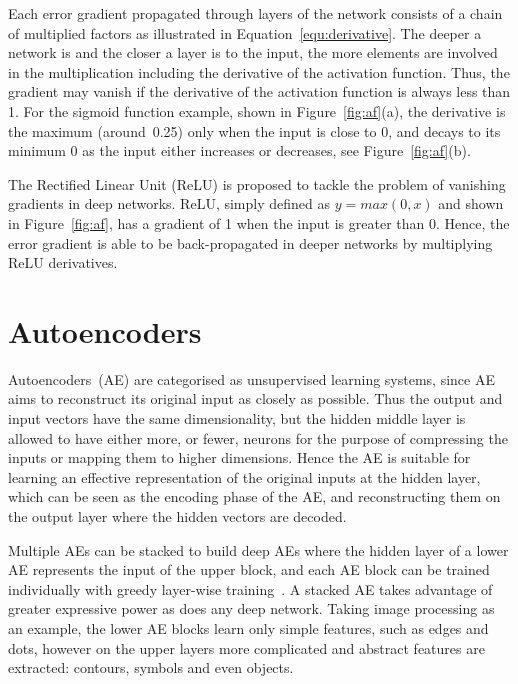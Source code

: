 Each error gradient propagated through layers of the network consists of a chain of multiplied factors as illustrated in Equation~\ref{equ:derivative}.
The deeper a network is and the closer a layer is to the input, the more elements are involved in the multiplication including the derivative of the activation function.
Thus, the gradient may vanish if the derivative of the activation function is always less than 1.
For the sigmoid function example, shown in Figure~\ref{fig:af}(a), the derivative is the maximum (around~0.25) only when the input is close to 0, and decays to its minimum 0 as the input either increases or decreases, see Figure~\ref{fig:af}(b).

The Rectified Linear Unit (ReLU) is proposed to tackle the problem of vanishing gradients in deep networks.
ReLU, simply defined as $y = max(0,x)$ and shown in Figure~\ref{fig:af}, has a gradient of 1 when the input is greater than 0.
Hence, the error gradient is able to be back-propagated in deeper networks by multiplying ReLU derivatives.

\section{Autoencoders}
\label{sec:AE}
Autoencoders~(AE) are categorised as unsupervised learning systems, since AE aims to reconstruct its original input as closely as possible.
Thus the output and input vectors have the same dimensionality, but the hidden middle layer is allowed to have either more, or fewer, neurons for the purpose of compressing the inputs or mapping them to higher dimensions.
Hence the AE is suitable for learning an effective representation of the original inputs at the hidden layer, which can be seen as the encoding phase of the AE, and reconstructing them on the output layer where the hidden vectors are decoded. 

Multiple AEs can be stacked to build deep AEs where the hidden layer of a lower AE represents the input of the upper block, and each AE block can be trained individually with greedy layer-wise training~\citep{hinton2006fast}.
A stacked AE takes advantage of greater expressive power as does any deep network.
Taking image processing as an example, the lower AE blocks learn only simple features, such as edges and dots, however on the upper layers more complicated and abstract features are extracted: contours, symbols and even objects. 

